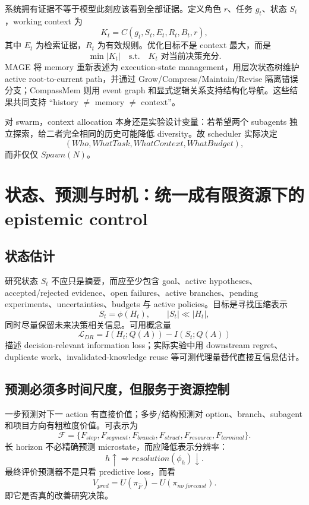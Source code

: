 \documentclass[11pt,a4paper]{ctexart}
\begin{document}
系统拥有证据不等于模型此刻应该看到全部证据。定义角色 $r$、任务 $g_t$、状态 $S_t$，working context 为
\begin{equation}
K_t=C(g_t,S_t,E_t,R_t,B_t,r),
\end{equation}
其中 $E_t$ 为检索证据，$R_t$ 为有效规则。优化目标不是 context 最大，而是
\begin{equation}
\min |K_t|\quad\text{s.t.}\quad K_t\text{ 对当前决策充分}.
\end{equation}
MAGE 将 memory 重新表述为 execution-state management，用层次状态树维护 active root-to-current path，并通过 Grow/Compress/Maintain/Revise 隔离错误分支\cite{chen2026mage}；CompassMem 则用 event graph 和显式逻辑关系支持结构化导航\cite{hu2026compass}。这些结果共同支持 ``history $\neq$ memory $\neq$ context''。

对 swarm，context allocation 本身还是实验设计变量：若希望两个 subagents 独立探索，给二者完全相同的历史可能降低 diversity。故 scheduler 实际决定
\begin{equation}
(Who,WhatTask,WhatContext,WhatBudget),
\end{equation}
而非仅仅 $Spawn(N)$。

\section{状态、预测与时机：统一成有限资源下的 epistemic control}

\subsection{状态估计}
研究状态 $S_t$ 不应只是摘要，而应至少包含 goal、active hypotheses、accepted/rejected evidence、open failures、active branches、pending experiments、uncertainties、budgets 与 active policies。目标是寻找压缩表示
\begin{equation}
S_t=\phi(H_t),\qquad |S_t|\ll |H_t|,
\end{equation}
同时尽量保留未来决策相关信息。可用概念量
\begin{equation}
\mathcal L_{DR}=I(H_t;Q(A))-I(S_t;Q(A))
\end{equation}
描述 decision-relevant information loss；实际实验中用 downstream regret、duplicate work、invalidated-knowledge reuse 等可测代理量替代直接互信息估计。

\subsection{预测必须多时间尺度，但服务于资源控制}
一步预测对下一 action 有直接价值；多步/结构预测对 option、branch、subagent 和项目方向有粗粒度价值。可表示为
\begin{equation}
\mathcal F=\{F_{step},F_{segment},F_{branch},F_{struct},F_{resource},F_{terminal}\}.
\end{equation}
长 horizon 不必精确预测 microstate，而应降低表示分辨率：
\begin{equation}
h\uparrow\Rightarrow resolution(\phi_h)\downarrow.
\end{equation}
最终评价预测器不是只看 predictive loss，而看
\begin{equation}
V_{pred}=U(\pi_{\hat F})-U(\pi_{no\ forecast}).
\end{equation}
即它是否真的改善研究决策。
\end{document}
